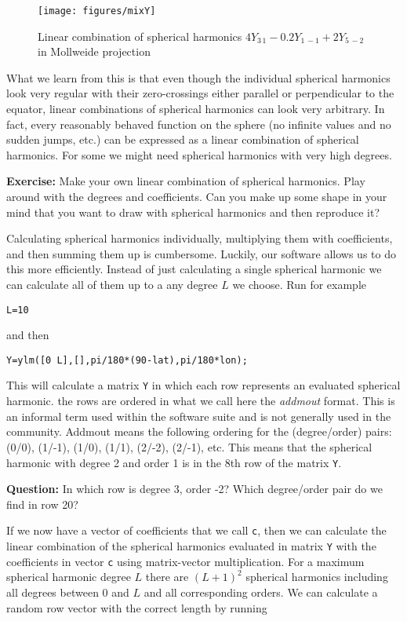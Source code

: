 \documentclass[11pt]{article}
\newcommand{\Yfun}{Y}
\begin{document}
\begin{figure}[h]%
  \centering
  \texttt{[image: figures/mixY]}
  \caption{Linear combination of spherical harmonics $4\Yfun_{3\,1} - 0.2\Yfun_{1\,-1} +2\Yfun_{5\,-2}$ in Mollweide projection}
  \label{MixY}
\end{figure}

What we learn from this is that even though the individual spherical
harmonics look very regular with their zero-crossings either parallel
or perpendicular to the equator, linear combinations of spherical
harmonics can look very arbitrary. In fact, every reasonably behaved
function on the sphere (no infinite values and no sudden jumps, etc.)
can be expressed as a linear combination of spherical harmonics. For
some we might need spherical harmonics with very high degrees.

\textbf{Exercise:} Make your own linear combination of spherical
harmonics. Play around with the degrees and coefficients. Can you make
up some shape in your mind that you want to draw with spherical
harmonics and then reproduce it?

Calculating spherical harmonics individually, multiplying them with
coefficients, and then summing them up is cumbersome. Luckily, our
software allows us to do this more efficiently. Instead of just
calculating a single spherical harmonic we can calculate all of them
up to a any degree $L$ we choose. Run for example

\quad \verb+L=10+

and then

\quad \verb+Y=ylm([0 L],[],pi/180*(90-lat),pi/180*lon);+

This will calculate a matrix \verb+Y+ in which each row represents an
evaluated spherical harmonic. the rows are ordered in what we call
here the \emph{addmout} format. This is an informal term used within
the software suite and is not generally used in the community. Addmout
means the following ordering for the (degree/order) pairs: (0/0),
(1/-1), (1/0), (1/1), (2/-2), (2/-1), etc. This means that the
spherical harmonic with degree 2 and order 1 is in the 8th row of the
matrix \verb+Y+.
   
\textbf{Question:} In which row is degree 3, order -2? Which
degree/order pair do we find in row 20?

If we now have a vector of coefficients that we call \verb+c+, then we
can calculate the linear combination of the spherical harmonics
evaluated in matrix \verb+Y+ with the coefficients in vector \verb+c+
using matrix-vector multiplication. For a maximum spherical harmonic
degree $L$ there are $(L+1)^2$ spherical harmonics including all
degrees between 0 and $L$ and all corresponding orders.  We can
calculate a random row vector with the correct length by running
\end{document}
